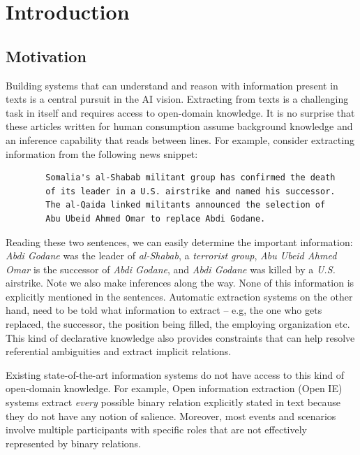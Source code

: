 \section{Introduction}
\subsection{Motivation}

Building systems that can understand and reason with information present in texts is a central pursuit in the AI vision. Extracting from texts is a challenging task in itself and requires access to open-domain knowledge. It is no surprise that these articles written for human consumption assume background knowledge and an inference capability that reads between lines. For example, consider extracting information from the following news snippet:

\begin{verbatim}
        Somalia's al-Shabab militant group has confirmed the death 
        of its leader in a U.S. airstrike and named his successor. 
        The al-Qaida linked militants announced the selection of 
        Abu Ubeid Ahmed Omar to replace Abdi Godane. 
\end{verbatim}
Reading these two sentences, we can easily determine the important information: {\em Abdi Godane} was the leader of {\em al-Shabab}, a {\em terrorist group}, {\em Abu Ubeid Ahmed Omar} is the successor of {\em Abdi Godane}, and {\em Abdi Godane} was killed by a {\em U.S.} airstrike.  Note we also make inferences along the way. None of this information is explicitly mentioned in the sentences. Automatic extraction systems on the other hand, need to be told what information to extract -- e.g, the one who gets replaced, the successor, the position being filled, the employing organization etc. This kind of declarative knowledge also provides constraints that can help resolve referential ambiguities and extract implicit relations. %

Existing state-of-the-art information systems do not have access to this kind of open-domain knowledge.
For example, Open information extraction (Open IE) systems extract {\em every} possible binary relation explicitly stated in text because they do not have any notion of salience. Moreover, most events and scenarios involve multiple participants with specific roles that are not effectively represented by binary relations. 

